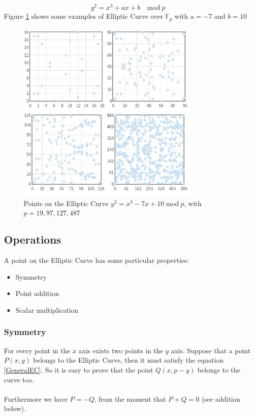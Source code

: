 \begin{equation}\label{GeneralECmodp}
y^2=x^3+ax+b \quad \textrm{mod} \ p
\end{equation}
Figure \ref{fig:EC_ex} shows some examples of Elliptic Curve over $\mathbb{F}_p$ with $a=-7$ and $b=10$
\begin{figure}[ht!]
	\centering
	\includegraphics[width=9cm]{Figures/EC_ex.jpg}
	\caption{Points on the Elliptic Curve $y^2=x^3-7x+10 \; \textrm{mod} \ p$, with $p=19,97,127,487$ }
	\label{fig:EC_ex}
\end{figure}






\subsection{Operations}
A point on the Elliptic Curve has some particular properties:
\begin{itemize}
	\item Symmetry
	\item Point addition
	\item Scalar multiplication
\end{itemize}

\subsubsection{Symmetry}
For every point in the $x$ axis exists two points in the $y$ axis. Suppose that a point $P(x,y)$ belongs to the Elliptic Curve, then it must satisfy the equation \ref{GeneralEC}.
So it is easy to prove that the point $Q(x,p-y)$ belongs to the curve too. \\ \\
Furthermore we have $P=-Q$, from the moment that $P+Q=0$ (see addition below).

